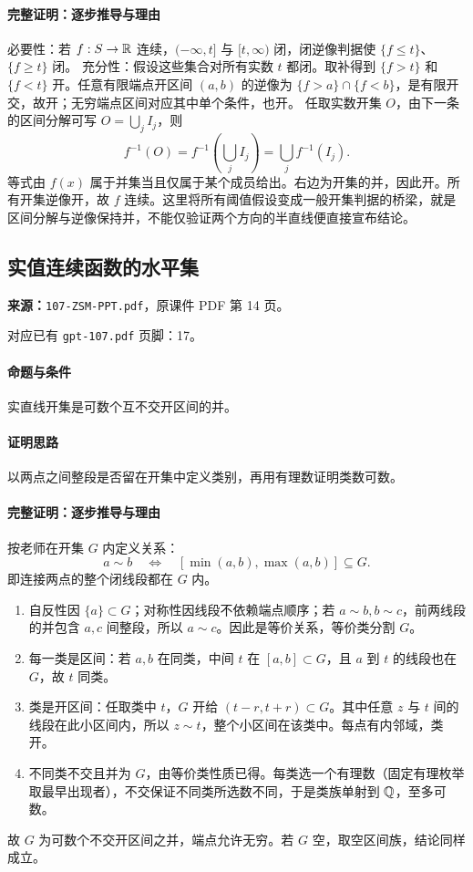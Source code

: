 \paragraph{完整证明：逐步推导与理由}

必要性：若 $f:S\to\mathbb{R}$ 连续，$(-\infty,t]$ 与 $[t,\infty)$ 闭，闭逆像判据使 $\{f\le t\}$、$\{f\ge t\}$ 闭。
充分性：假设这些集合对所有实数 $t$ 都闭。取补得到 $\{f>t\}$ 和 $\{f<t\}$ 开。任意有限端点开区间 $(a,b)$ 的逆像为 $\{f>a\}\cap\{f<b\}$，是有限开交，故开；无穷端点区间对应其中单个条件，也开。
任取实数开集 $O$，由下一条的区间分解可写 $O=\bigcup_j I_j$，则
\[f^{-1}(O)=f^{-1}(\bigcup_jI_j)=\bigcup_jf^{-1}(I_j).\]
等式由 $f(x)$ 属于并集当且仅属于某个成员给出。右边为开集的并，因此开。所有开集逆像开，故 $f$ 连续。这里将所有阈值假设变成一般开集判据的桥梁，就是区间分解与逆像保持并，不能仅验证两个方向的半直线便直接宣布结论。

\clearpage\subsection{实值连续函数的水平集}
\textbf{来源：}\texttt{107-ZSM-PPT.pdf}，原课件 PDF 第 14 页。\par
对应已有 \texttt{gpt-107.pdf} 页脚：17。\par
\paragraph{命题与条件}实直线开集是可数个互不交开区间的并。
\paragraph{证明思路}以两点之间整段是否留在开集中定义类别，再用有理数证明类数可数。
\paragraph{完整证明：逐步推导与理由}

按老师在开集 $G$ 内定义关系：
\[a\sim b\quad\Longleftrightarrow\quad[\min(a,b),\max(a,b)]\subseteq G.\]
即连接两点的整个闭线段都在 $G$ 内。
\begin{enumerate}
\item 自反性因 $\{a\}\subset G$；对称性因线段不依赖端点顺序；若 $a\sim b,b\sim c$，前两线段的并包含 $a,c$ 间整段，所以 $a\sim c$。因此是等价关系，等价类分割 $G$。
\item 每一类是区间：若 $a,b$ 在同类，中间 $t$ 在 $[a,b]\subset G$，且 $a$ 到 $t$ 的线段也在 $G$，故 $t$ 同类。
\item 类是开区间：任取类中 $t$，$G$ 开给 $(t-r,t+r)\subset G$。其中任意 $z$ 与 $t$ 间的线段在此小区间内，所以 $z\sim t$，整个小区间在该类中。每点有内邻域，类开。
\item 不同类不交且并为 $G$，由等价类性质已得。每类选一个有理数（固定有理枚举取最早出现者），不交保证不同类所选数不同，于是类族单射到 $\mathbb{Q}$，至多可数。
\end{enumerate}
故 $G$ 为可数个不交开区间之并，端点允许无穷。若 $G$ 空，取空区间族，结论同样成立。

